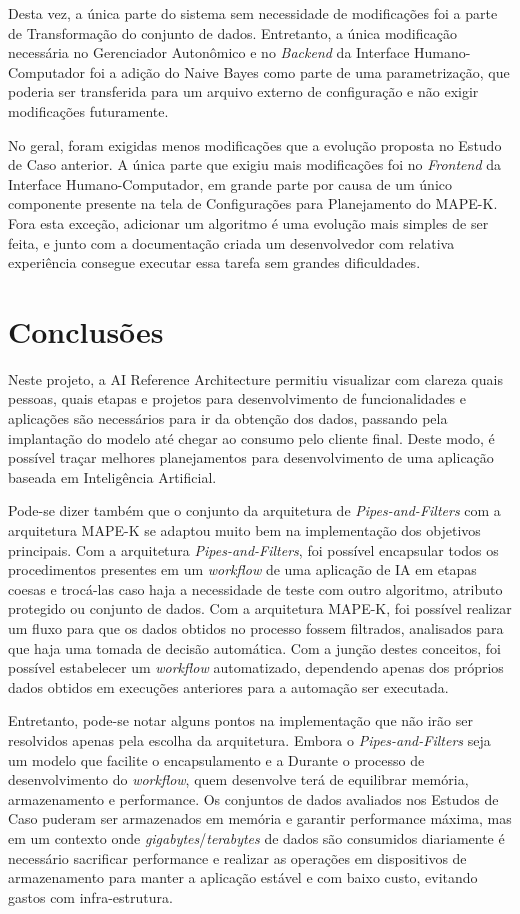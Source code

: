 \documentclass[portugues]{ic-tese}
\begin{document}
Desta vez, a única parte do sistema sem necessidade de modificações foi a parte de Transformação do conjunto de dados. Entretanto, a única modificação necessária no Gerenciador Autonômico e no \textit{Backend} da Interface Humano-Computador foi a adição do Naive Bayes como parte de uma parametrização, que poderia ser transferida para um arquivo externo de configuração e não exigir modificações futuramente.

No geral, foram exigidas menos modificações que a evolução proposta no Estudo de Caso anterior. A única parte que exigiu mais modificações foi no \textit{Frontend} da Interface Humano-Computador, em grande parte por causa de um único componente presente na tela de Configurações para Planejamento do MAPE-K. Fora esta exceção, adicionar um algoritmo é uma evolução mais simples de ser feita, e junto com a documentação criada um desenvolvedor com relativa experiência consegue executar essa tarefa sem grandes dificuldades.

\chapter{Conclusões}

Neste projeto, a AI Reference Architecture permitiu visualizar com clareza quais pessoas, quais etapas e projetos para desenvolvimento de funcionalidades e aplicações são necessários para ir da obtenção dos dados, passando pela implantação do modelo até chegar ao consumo pelo cliente final. Deste modo, é possível traçar melhores planejamentos para desenvolvimento de uma aplicação baseada em Inteligência Artificial. 

Pode-se dizer também que o conjunto da arquitetura de \textit{Pipes-and-Filters} com a arquitetura MAPE-K se adaptou muito bem na implementação dos objetivos principais. Com a arquitetura \textit{Pipes-and-Filters}, foi possível encapsular todos os procedimentos presentes em um \textit{workflow} de uma aplicação de IA em etapas coesas e trocá-las caso haja a necessidade de teste com outro algoritmo, atributo protegido ou conjunto de dados. Com a arquitetura MAPE-K, foi possível realizar um fluxo para que os dados obtidos no processo fossem filtrados, analisados para que haja uma tomada de decisão automática. Com a junção destes conceitos, foi possível estabelecer um \textit{workflow} automatizado, dependendo apenas dos próprios dados obtidos em execuções anteriores para a automação ser executada.

Entretanto, pode-se notar alguns pontos na implementação que não irão ser resolvidos apenas pela escolha da arquitetura. Embora o \textit{Pipes-and-Filters} seja um modelo que facilite o encapsulamento e a Durante o processo de desenvolvimento do \textit{workflow}, quem desenvolve terá de equilibrar memória, armazenamento e performance. Os conjuntos de dados avaliados nos Estudos de Caso puderam ser armazenados em memória e garantir performance máxima, mas em um contexto onde \textit{gigabytes}/\textit{terabytes} de dados são consumidos diariamente é necessário sacrificar performance e realizar as operações em dispositivos de armazenamento para manter a aplicação estável e com baixo custo, evitando gastos com infra-estrutura.
\end{document}
